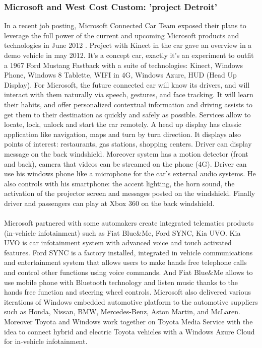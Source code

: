 \documentclass[a4paper]{article}
\begin{document}
\subsubsection{Microsoft and West Cost Custom: 'project Detroit'}

In a recent job posting, Microsoft Connected Car Team exposed their plans to leverage the full power of the current and upcoming Microsoft products and technologies in June 2012 \cite{West}. Project with Kinect in the car gave an overview in a demo vehicle in may 2012. It's a concept car, exactly it's an experiment to outfit a 1967 Ford Mustang Fastback with a suite of technologies: Kinect, Windows Phone, Windows 8 Tablette, WIFI in 4G, Windows Azure, HUD (Head Up Display). For Microsoft, the future connected car will know its drivers, and will interact with them naturally via speech, gestures, and face tracking. It will learn their habits, and offer personalized contextual information and driving assists to get them to their destination as quickly and safely as possible. Services allow to locate, lock, unlock and start the car remotely. A head up display has classic application like navigation, maps and turn by turn direction. It displays also points of interest: restaurants, gas stations, shopping centers. Driver can display message on the back windshield. Moreover system has a motion detector (front and back), camera that videos can be streamed on the phone (4G). Driver can use his windows phone like a microphone for the car's external audio systems. He also controls with his smartphone: the accent lighting, the horn sound, the activation of the projector screen and messages posted on the windshield. Finally driver and passengers can play at Xbox 360 on the back windshield.

\paragraph{}Microsoft partnered with some automakers create integrated telematics products (in-vehicle infotainment) such as Fiat Blue\&Me, Ford SYNC, Kia UVO. Kia UVO is car infotainment system with advanced voice and touch activated features. Ford SYNC is a factory installed, integrated in vehicle communications and entertainment system that allows users to make hands free telephone calls and control other functions using voice commands. And Fiat Blue\&Me allows to use mobile phone with Bluetooth technology and listen music thanks to the hands free function and steering wheel controls. Microsoft also delivered various iterations of Windows embedded automotive platform to the automotive suppliers such as Honda, Nissan, BMW, Mercedes-Benz, Aston Martin, and McLaren. Moreover Toyota and Windows work together on Toyota Media Service with the idea to connect hybrid and electric Toyota vehicles with a Windows Azure Cloud for in-vehicle infotainment.
\end{document}
